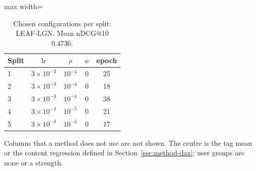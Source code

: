 \begin{table}[tbp]
\centering
\footnotesize
\caption{Chosen configurations per split: LEAF-LGN. Mean nDCG@10 0.4736.}
\label{tab:grid01}
\begin{adjustbox}{max width=\linewidth}
\begin{tabular}{lcccc}
\toprule
Split & $\mathrm{lr}$ & $\rho$ & $w$ & epoch \\
\midrule
1 & $3\times10^{-3}$ & $10^{-4}$ & 0 & 25 \\
2 & $3\times10^{-3}$ & $10^{-4}$ & 0 & 18 \\
3 & $3\times10^{-3}$ & $10^{-4}$ & 0 & 38 \\
4 & $3\times10^{-3}$ & $10^{-5}$ & 0 & 21 \\
5 & $3\times10^{-3}$ & $10^{-4}$ & 0 & 17 \\
\bottomrule
\end{tabular}
\end{adjustbox}
\par\smallskip
\begin{minipage}{\linewidth}\raggedright\footnotesize Columns that a method does not use are not shown. The centre is the tag mean or the content regression defined in Section~\ref{sec:method-dax}; user groups are none or a strength.\end{minipage}
\end{table}
